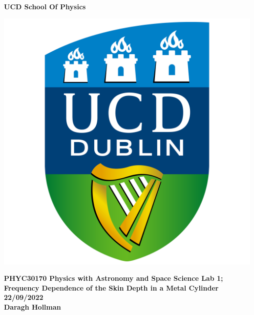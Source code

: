 \documentclass[a4paper,12pt,twocolumn]{article}
\begin{document}
\begin{titlepage}
	\begin{center}
		
		\thispagestyle{empty}
		
		\Huge{
			\textbf{UCD School Of Physics}
		}
		
		\vspace{1cm}	
		
		\includegraphics[scale=0.08]{UCDLogo.png}
		
		\vspace{1cm}
		
		\large{
			\textbf{PHYC30170 Physics with Astronomy and Space Science Lab 1; \\
				Frequency Dependence of the Skin Depth in a Metal Cylinder \\
				\vspace{1cm}
				22/09/2022 \\
				\vspace{1cm}
				Daragh Hollman}
		} \\
		
	\end{center}
\end{titlepage}

\twocolumn[
\begin{@twocolumnfalse}
	\begin{abstract}
		...
	\end{abstract}
\end{@twocolumnfalse}
]
\end{document}
